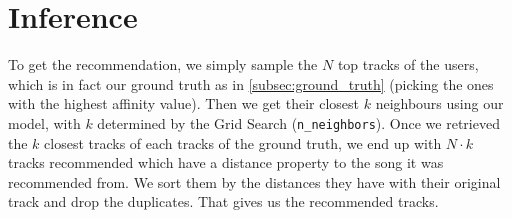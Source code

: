 \section{Inference}
To get the recommendation, we simply sample the $N$ top tracks of the users, which is in fact our ground truth as in \ref{subsec:ground_truth} (picking the ones with the highest affinity value). Then we get their closest $k$ neighbours using our model, with $k$ determined by the Grid Search (\texttt{n\_neighbors}). Once we retrieved the $k$ closest tracks of each tracks of the ground truth, we end up with $N \cdot k$ tracks recommended which have a distance property to the song it was recommended from. We sort them by the distances they have with their original track and drop the duplicates. That gives us the recommended tracks.

